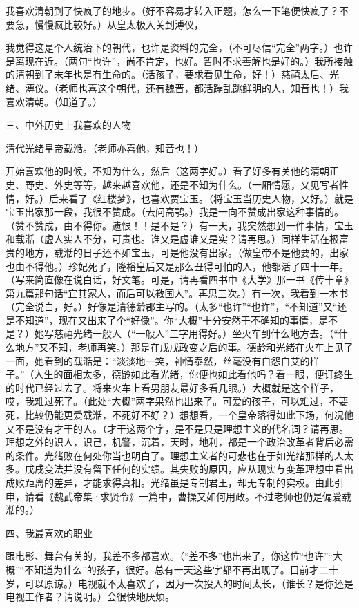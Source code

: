 \par 我喜欢清朝到了快疯了的地步。（好不容易才转入正题，怎么一下笔便快疯了？不要急，慢慢疯比较好。）从皇太极入关到溥仪，
\par 我觉得这是个人统治下的朝代，也许是资料的完全，（不可尽信“完全”两字。）也许是离现在近。（两句“也许”，尚不肯定，也好。暂时不求善解也是好的。）我所接触的清朝到了末年也是有生命的。（活孩子，要求看见生命，好！）慈禧太后、光绪、溥仪。（老师也喜这个朝代，还有魏晋，都活蹦乱跳鲜明的人，知音也！）我喜欢清朝。（知道了。）
\par 三、中外历史上我喜欢的人物
\par 清代光绪皇帝载湉。（老师亦喜他，知音也！）
\par 开始喜欢他的时候，不知为什么，然后（这两字好。）看了好多有关他的清朝正史、野史、外史等等，越来越喜欢他，还是不知为什么。（一厢情愿，又见写者性情，好。）后来看了《红楼梦》，也喜欢贾宝玉。（将宝玉当历史人物，又好。）就是宝玉出家那一段，我很不赞成。（去问高鹗。）我是一向不赞成出家这种事情的。（赞不赞成，由不得你。遗恨！！是不是？）有一天，我突然想到一件事情，宝玉和载湉（虚人实人不分，可贵也。谁又是虚谁又是实？请再思。）同样生活在极富贵的地方，载湉的日子还不如宝玉，可是他没有出家。（做皇帝不是他要的，出家也由不得他。）珍妃死了，隆裕皇后又是那么丑得可怕的人，他都活了四十一年。（写来简直像在说白话，好文笔。可是，请再看四书中《大学》那一书《传十章》第九篇那句话“宜其家人，而后可以教国人”。再思三次。）有一次，我看到一本书（完全说白，好。）好像是清德龄郡主写的。（太多“也许”“也许”，“不知道”又“还是不知道”，现在又出来了个“好像”。你“大概”十分安然于不确知的事情，是不是？）她写慈禧光绪一般人（“一般人”三字用得好。）坐火车到什么地方去。（“什么地方”又不知，老师再笑。）那是在戊戌政变之后的事。德龄和光绪在火车上见了一面，她看到的载湉是：“淡淡地一笑，神情泰然，丝毫没有自怨自艾的样子。”（人生的面相太多，德龄如此看光绪，你便也如此看他吗？看一眼，便订终生的时代已经过去了。将来火车上看男朋友最好多看几眼。）大概就是这个样子，哎，我难过死了。（此处“大概”两字果然也出来了。可爱的孩子，可以难过，不要死，比较仍能更爱载湉，不死好不好？）想想看，一个皇帝落得如此下场，何况他又不是没有才干的人。（才干这两个字，是不是只是理想主义的代名词？请再思。理想之外的识人，识己，机警，沉着，天时，地利，都是一个政治改革者背后必需的条件。光绪败在何处你当也明白了。理想主义者的可悲也在于如光绪那样的人太多。戊戌变法并没有留下任何的实绩。其失败的原因，应从现实与变革理想中看出成败距离的差异，才能求得真相。光绪虽是专制君王，却无专制的实权。由此引申，请看《魏武帝集·求贤令》一篇中，曹操又如何用政。不过老师也仍是偏爱载湉的。）
\par 四、我最喜欢的职业
\par 跟电影、舞台有关的，我差不多都喜欢。（“差不多”也出来了，你这位“也许”“大概”“不知道为什么”的孩子，很好。总有一天这些字都不再出现了。目前才二十岁，可以原谅。）电视就不太喜欢了，因为一次投入的时间太长，（谁长？是你还是电视工作者？请说明。）会很快地厌烦。
